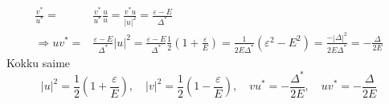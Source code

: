 \documentclass[class=article, crop=false]{standalone}
\begin{document}
\begin{equation}\label{key}
	\begin{split}
		\frac{v^{ \ast}}{u^{ \ast}} = & \frac{v^{ \ast}}{u^{ \ast}} \frac{u}{u} = \frac{v^{ \ast} u}{|u|^{2}} = \frac{ \varepsilon - E}{ \Delta^{ \ast}} \\
		\Rightarrow u v^{ \ast} = & \frac{ \varepsilon - E}{ \Delta^{ \ast}} |u|^{2} = \frac{ \varepsilon - E}{ \Delta^{ \ast}} \frac{1}{2} \left( 1 + \frac{ \varepsilon}{E} \right) = \frac{1}{2 E \Delta^{ \ast}} ( \varepsilon^{2} - E^{2}) = \frac{- | \Delta|^{2}}{2 E \Delta^{ \ast}} = - \frac{ \Delta}{2 E}
	\end{split}
\end{equation}
Kokku saime
\begin{equation}\label{URuutVRuutVUUV}
	|u|^{2} = \frac{1}{2} \left( 1 + \frac{ \varepsilon}{E} \right), \quad |v|^{2} = \frac{1}{2} \left( 1 - \frac{ \varepsilon}{E} \right), \quad v u^{ \ast} = - \frac{ \Delta^{ \ast}}{2 E}, \quad u v^{ \ast} = - \frac{ \Delta}{2 E}
\end{equation}
\end{document}
